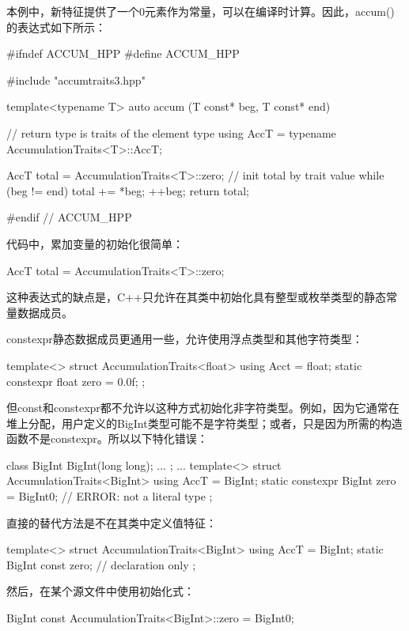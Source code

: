 本例中，新特征提供了一个0元素作为常量，可以在编译时计算。因此，accum()的表达式如下所示：

\begin{cpp}
#ifndef ACCUM_HPP
#define ACCUM_HPP

#include "accumtraits3.hpp"

template<typename T>
auto accum (T const* beg, T const* end)
{
	// return type is traits of the element type
	using AccT = typename AccumulationTraits<T>::AccT;
	
	AccT total = AccumulationTraits<T>::zero; // init total by trait value
	while (beg != end) {
		total += *beg;
		++beg;
	}
	return total;
}

#endif // ACCUM_HPP
\end{cpp}

代码中，累加变量的初始化很简单：

\begin{cpp}
AccT total = AccumulationTraits<T>::zero;
\end{cpp}

这种表达式的缺点是，C++只允许在其类中初始化具有整型或枚举类型的静态常量数据成员。

constexpr静态数据成员更通用一些，允许使用浮点类型和其他字符类型：

\begin{cpp}
template<>
struct AccumulationTraits<float> {
	using Acct = float;
	static constexpr float zero = 0.0f;
};
\end{cpp}

但const和constexpr都不允许以这种方式初始化非字符类型。例如，因为它通常在堆上分配，用户定义的BigInt类型可能不是字符类型；或者，只是因为所需的构造函数不是constexpr。所以以下特化错误：

\begin{cpp}
class BigInt {
	BigInt(long long);
	...
};
...
template<>
struct AccumulationTraits<BigInt> {
	using AccT = BigInt;
	static constexpr BigInt zero = BigInt{0}; // ERROR: not a literal type
};
\end{cpp}

直接的替代方法是不在其类中定义值特征：

\begin{cpp}
template<>
struct AccumulationTraits<BigInt> {
	using AccT = BigInt;
	static BigInt const zero; // declaration only
};
\end{cpp}

然后，在某个源文件中使用初始化式：

\begin{cpp}
BigInt const AccumulationTraits<BigInt>::zero = BigInt{0};
\end{cpp}

